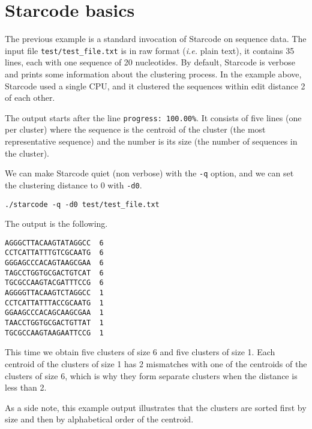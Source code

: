 \documentclass[12pt]{article}
\begin{document}
\section{Starcode basics}

The previous example is a standard invocation of Starcode on sequence
data. The input file \texttt{test/test\_file.txt} is in raw format
(\textit{i.e.} plain text), it contains 35 lines, each with one
sequence of 20 nucleotides. By default, Starcode is verbose and prints
some information about the clustering process. In the example above,
Starcode used a single CPU, and it clustered the sequences within
edit distance 2 of each other.

The output starts after the line \texttt{progress: 100.00\%}. It
consists of five lines (one per cluster) where the sequence is the
centroid of the cluster (the most representative sequence) and the
number is its size (the number of sequences in the cluster).

We can make Starcode quiet (non verbose) with the \texttt{-q} option,
and we can set the clustering distance to 0 with \texttt{-d0}.

\begin{verbatim}
./starcode -q -d0 test/test_file.txt
\end{verbatim}

The output is the following.

\begin{verbatim}
AGGGCTTACAAGTATAGGCC  6
CCTCATTATTTGTCGCAATG  6
GGGAGCCCACAGTAAGCGAA  6
TAGCCTGGTGCGACTGTCAT  6
TGCGCCAAGTACGATTTCCG  6
AGGGGTTACAAGTCTAGGCC  1
CCTCATTATTTACCGCAATG  1
GGAAGCCCACAGCAAGCGAA  1
TAACCTGGTGCGACTGTTAT  1
TGCGCCAAGTAAGAATTCCG  1
\end{verbatim}

This time we obtain five clusters of size 6 and five clusters of size 1.
Each centroid of the clusters of size 1 has 2 mismatches with one
of the centroids of the clusters of size 6, which is why they form
separate clusters when the distance is less than 2.

As a side note, this example output illustrates that the clusters
are sorted first by size and then by alphabetical order of the
centroid.
\end{document}
